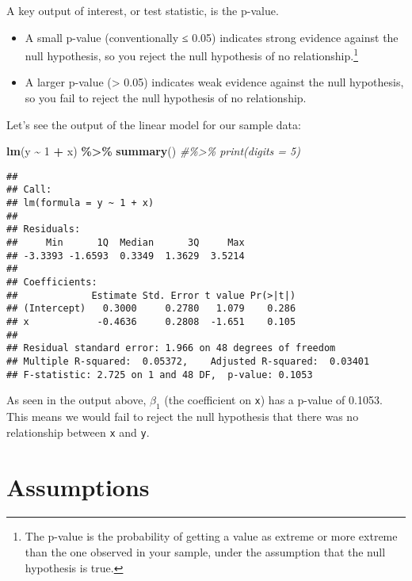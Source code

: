 \documentclass[
  12pt,
]{krantz}
\newenvironment{Shaded}{\begin{snugshade}}{\end{snugshade}}
\newcommand{\CommentTok}[1]{\textcolor[rgb]{0.56,0.35,0.01}{\textit{#1}}}
\newcommand{\DecValTok}[1]{\textcolor[rgb]{0.00,0.00,0.81}{#1}}
\newcommand{\KeywordTok}[1]{\textcolor[rgb]{0.13,0.29,0.53}{\textbf{#1}}}
\newcommand{\NormalTok}[1]{#1}
\newcommand{\OperatorTok}[1]{\textcolor[rgb]{0.81,0.36,0.00}{\textbf{#1}}}
\newcommand{\StringTok}[1]{\textcolor[rgb]{0.31,0.60,0.02}{#1}}
\providecommand{\tightlist}{%
  \setlength{\itemsep}{0pt}\setlength{\parskip}{0pt}}
\begin{document}
A key output of interest, or test statistic, is the p-value.

\begin{itemize}
\tightlist
\item
  A small p-value (conventionally ≤ 0.05) indicates strong evidence against the null hypothesis, so you reject the null hypothesis of no relationship.\footnote{The p-value is the probability of getting a value as extreme or more extreme than the one observed in your sample, under the assumption that the null hypothesis is true.}
\item
  A larger p-value (\textgreater{} 0.05) indicates weak evidence against the null hypothesis, so you fail to reject the null hypothesis of no relationship.
\end{itemize}

Let's see the output of the linear model for our sample data:

\begin{Shaded}
\begin{Highlighting}[]
\KeywordTok{lm}\NormalTok{(y }\OperatorTok{\textasciitilde{}}\StringTok{ }\DecValTok{1} \OperatorTok{+}\StringTok{ }\NormalTok{x) }\OperatorTok{\%\textgreater{}\%}\StringTok{ }\KeywordTok{summary}\NormalTok{() }\CommentTok{\#\%\textgreater{}\% print(digits = 5)}
\end{Highlighting}
\end{Shaded}

\begin{verbatim}
## 
## Call:
## lm(formula = y ~ 1 + x)
## 
## Residuals:
##     Min      1Q  Median      3Q     Max 
## -3.3393 -1.6593  0.3349  1.3629  3.5214 
## 
## Coefficients:
##             Estimate Std. Error t value Pr(>|t|)
## (Intercept)   0.3000     0.2780   1.079    0.286
## x            -0.4636     0.2808  -1.651    0.105
## 
## Residual standard error: 1.966 on 48 degrees of freedom
## Multiple R-squared:  0.05372,    Adjusted R-squared:  0.03401 
## F-statistic: 2.725 on 1 and 48 DF,  p-value: 0.1053
\end{verbatim}

As seen in the output above, \(\beta_1\) (the coefficient on \texttt{x}) has a p-value of 0.1053. This means we would fail to reject the null hypothesis that there was no relationship between \texttt{x} and \texttt{y}.

\hypertarget{assumptions}{%
\section{Assumptions}\label{assumptions}}
\end{document}
